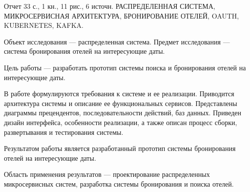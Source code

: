 {}
Отчет 33 с., 1 кн., 11 рис., 6 источн. \newline
РАСПРЕДЕЛЕННАЯ СИСТЕМА, МИКРОСЕРВИСНАЯ АРХИТЕКТУРА, БРОНИРОВАНИЕ ОТЕЛЕЙ, OAUTH, KUBERNETES, KAFKA.

Объект исследования --- распределенная система. Предмет исследования --- система бронирования отелей на интересующие даты.

Цель работы --- разработать прототип системы поиска и бронирования отелей на интересующие даты.

В работе формулируются требования к системе и ее реализации. Приводится архитектура системы и описание ее функциональных сервисов. Представлены диаграммы прецендентов, последовательности действий, баз данных. Приведен дизайн интерфейса, особенности реализации, а также описан процесс сборки, развертывания и тестирования системы.

Результатом работы является разработанный прототип системы бронирования отелей на интересующие даты.

Область применения результатов --- проектирование распределенных микросервисных систем, разработка системы бронирования и поиска отелей.